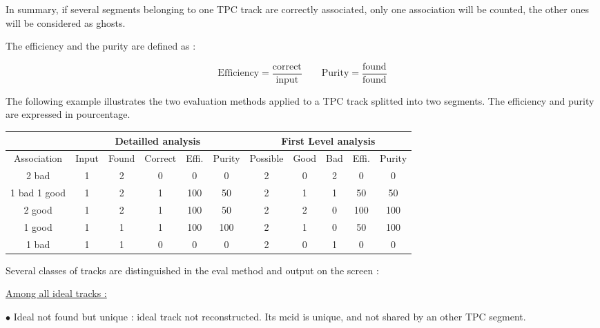 \documentclass[twoside]{article}
\begin{document}
\vspace*{0.4cm}
In summary, if several segments belonging to one TPC track are
correctly associated, only one association will be counted, the other
ones will be considered as ghosts. 



The efficiency and the purity are defined as :

$$ \mbox{Efficiency} = \frac{\mbox{correct}}{\mbox{input}} \qquad \mbox{Purity} = \frac{\mbox{found}}{\mbox{found}}$$

\vspace*{0.4cm}

The following example illustrates the two evaluation methods applied
to a TPC track splitted into two segments. The efficiency and purity
are expressed in pourcentage.

\begin{center}
\begin{tabular}{|c|c|c|c|c|c||c|c|c|c|c|} \hline
&\multicolumn{5}{|c||}{Detailled analysis}&\multicolumn{5}{|c|}{First Level analysis}\\ \hline
Association & Input & Found & Correct & Effi. & Purity & Possible & Good & Bad & Effi. & Purity \\ \hline
2 bad        & 1 & 2 & 0 &   0 &  0 & 2 & 0 & 2 &   0 &  0\\ \hline    
1 bad 1 good & 1 & 2 & 1 & 100 & 50 & 2 & 1 & 1 &  50 & 50\\ \hline    
2 good       & 1 & 2 & 1 & 100 & 50 & 2 & 2 & 0 & 100 &100\\ \hline    
1 good       & 1 & 1 & 1 & 100 &100 & 2 & 1 & 0 &  50 &100\\ \hline    
1 bad        & 1 & 1 & 0 &  0  &  0 & 2 & 0 & 1 &   0 &  0\\ \hline    
\end{tabular}
\end{center}

\vspace*{0.4cm}
Several classes of tracks are distinguished in the eval method and
output on the screen :

\vspace*{0.2cm}
\underline{Among all ideal tracks :} 

$\bullet$ Ideal not found but unique : ideal track not
reconstructed. Its mcid is unique, and not shared by an other TPC
segment.
\end{document}

